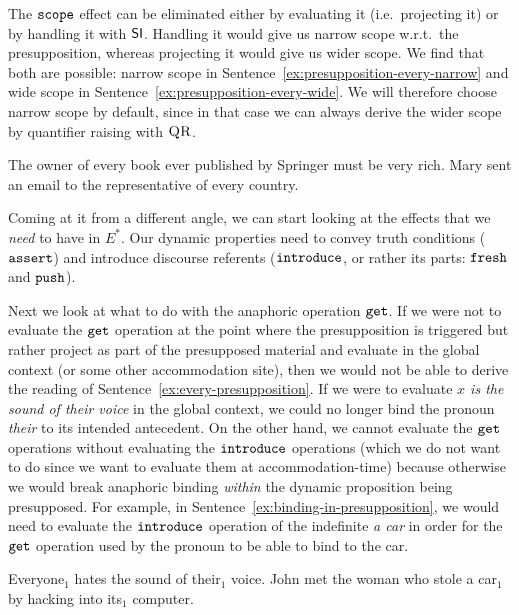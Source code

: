 The $\mathtt{scope}$ effect can be eliminated either by evaluating it (i.e.\
projecting it) or by handling it with $\textsf{SI}$. Handling it would give us
narrow scope w.r.t.\ the presupposition, whereas projecting it would give
us wider scope. We find that both are possible: narrow scope in
Sentence~\ref{ex:presupposition-every-narrow} and wide scope in
Sentence~\ref{ex:presupposition-every-wide}. We will therefore choose
narrow scope by default, since in that case we can always derive the wider
scope by quantifier raising with $\textsc{QR}$.

\begin{exe}
  \ex The owner of every book ever published by Springer must be very
  rich. \label{ex:presupposition-every-narrow}
  \ex Mary sent an email to the representative of every
  country. \label{ex:presupposition-every-wide}
\end{exe}

Coming at it from a different angle, we can start looking at the effects
that we \emph{need} to have in $E^*$. Our dynamic properties need to convey
truth conditions ($\mathtt{assert}$) and introduce discourse referents
($\mathtt{introduce}$, or rather its parts: $\mathtt{fresh}$ and $\mathtt{push}$).

Next we look at what to do with the anaphoric operation $\mathtt{get}$. If we
were not to evaluate the $\mathtt{get}$ operation at the point where the
presupposition is triggered but rather project as part of the presupposed
material and evaluate in the global context (or some other accommodation
site), then we would not be able to derive the reading of
Sentence~\ref{ex:every-presupposition}. If we were to evaluate \emph{$x$ is
  the sound of their voice} in the global context, we could no longer bind
the pronoun \emph{their} to its intended antecedent. On the other hand, we
cannot evaluate the $\mathtt{get}$ operations without evaluating the
$\mathtt{introduce}$ operations (which we do not want to do since we want to
evaluate them at accommodation-time) because otherwise we would break
anaphoric binding \emph{within} the dynamic proposition being
presupposed. For example, in Sentence~\ref{ex:binding-in-presupposition},
we would need to evaluate the $\mathtt{introduce}$ operation of the indefinite
\emph{a car} in order for the $\mathtt{get}$ operation used by the pronoun to
be able to bind to the car.

\begin{exe}
  \ex Everyone$_1$ hates the sound of their$_1$
  voice. \label{ex:every-presupposition}
  \ex John met the woman who stole a car$_1$ by hacking into its$_1$
  computer. \label{ex:binding-in-presupposition}
\end{exe}

